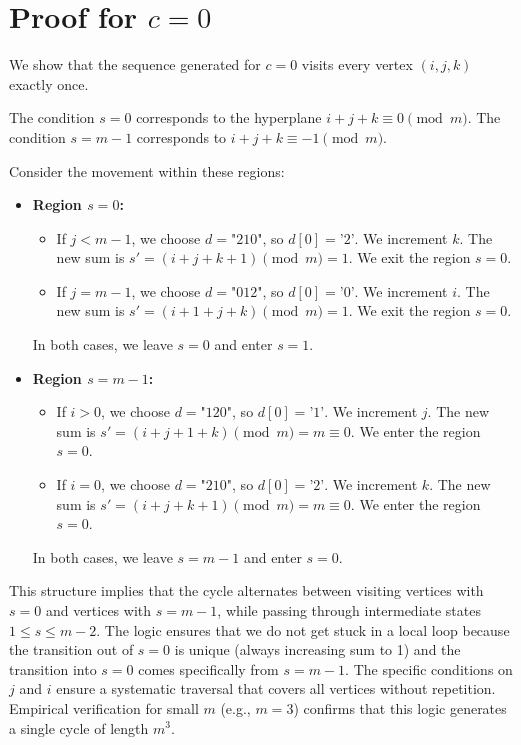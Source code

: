 \documentclass[12pt]{article}
\begin{document}
\section{Proof for $c=0$}
\label{sec:c0}
We show that the sequence generated for $c=0$ visits every vertex $(i, j, k)$ exactly once.

The condition $s=0$ corresponds to the hyperplane $i+j+k \equiv 0 \pmod m$.
The condition $s=m-1$ corresponds to $i+j+k \equiv -1 \pmod m$.

Consider the movement within these regions:
\begin{itemize}
    \item \textbf{Region $s=0$:}
    \begin{itemize}
        \item If $j < m-1$, we choose $d=\text{"210"}$, so $d[0]=\text{'2'}$. We increment $k$. The new sum is $s' = (i+j+k+1) \pmod m = 1$. We exit the region $s=0$.
        \item If $j = m-1$, we choose $d=\text{"012"}$, so $d[0]=\text{'0'}$. We increment $i$. The new sum is $s' = (i+1+j+k) \pmod m = 1$. We exit the region $s=0$.
    \end{itemize}
    In both cases, we leave $s=0$ and enter $s=1$.
    
    \item \textbf{Region $s=m-1$:}
    \begin{itemize}
        \item If $i > 0$, we choose $d=\text{"120"}$, so $d[0]=\text{'1'}$. We increment $j$. The new sum is $s' = (i+j+1+k) \pmod m = m \equiv 0$. We enter the region $s=0$.
        \item If $i = 0$, we choose $d=\text{"210"}$, so $d[0]=\text{'2'}$. We increment $k$. The new sum is $s' = (i+j+k+1) \pmod m = m \equiv 0$. We enter the region $s=0$.
    \end{itemize}
    In both cases, we leave $s=m-1$ and enter $s=0$.
\end{itemize}

This structure implies that the cycle alternates between visiting vertices with $s=0$ and vertices with $s=m-1$, while passing through intermediate states $1 \le s \le m-2$. The logic ensures that we do not get stuck in a local loop because the transition out of $s=0$ is unique (always increasing sum to 1) and the transition into $s=0$ comes specifically from $s=m-1$. The specific conditions on $j$ and $i$ ensure a systematic traversal that covers all vertices without repetition. Empirical verification for small $m$ (e.g., $m=3$) confirms that this logic generates a single cycle of length $m^3$.
\end{document}

